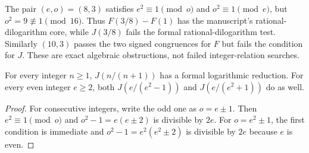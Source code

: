\begin{remark}
The pair $(e,o)=(8,3)$ satisfies $e^2\equiv1\pmod o$ and
$o^2\equiv1\pmod e$, but $o^2=9\not\equiv1\pmod{16}$.
Thus $F(3/8)-F(1)$ has the manuscript's rational-dilogarithm core,
while $J(3/8)$ fails the formal rational-dilogarithm test. Similarly
$(10,3)$ passes the two signed congruences for $F$ but fails the
condition for $J$. These are exact algebraic obstructions, not
failed integer-relation searches.
\end{remark}

\begin{corollary}\label{jnew:cor:families}
For every integer $n\ge1$, $J(n/(n+1))$ has a formal logarithmic
reduction. For every even integer $e\ge2$, both
$J(e/(e^2-1))$ and $J(e/(e^2+1))$ do as well.
\end{corollary}
\begin{proof}
For consecutive integers, write the odd one as $o=e\pm1$.
Then $e^2\equiv1\pmod o$ and
$o^2-1=e(e\pm2)$ is divisible by $2e$.
For $o=e^2\pm1$, the first condition is immediate and
$o^2-1=e^2(e^2\pm2)$ is divisible by $2e$ because $e$ is even.
\end{proof}
